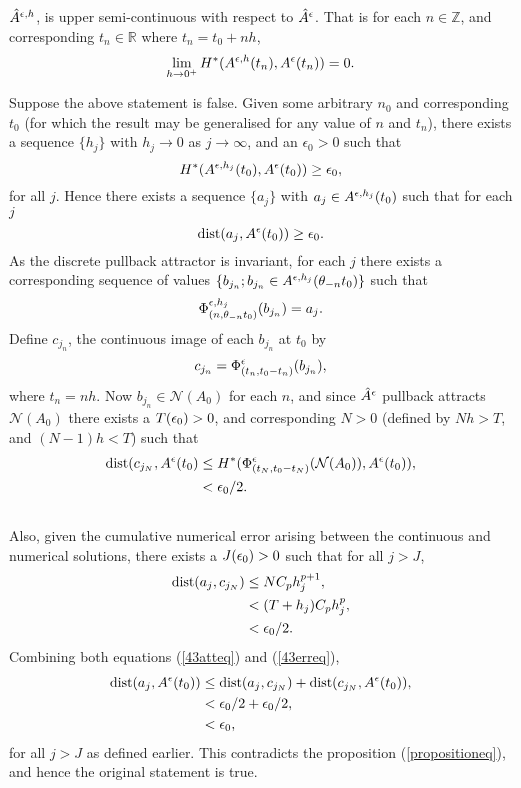 \begin{cor}
  $\hat{A}^{\epsilon, h}$, is upper semi-continuous with respect to
  $\hat{A}^{\epsilon}$. That is for each $n \in \mathbb{Z}$, and corresponding
  $t_n \in \mathbb{R}$ where $t_n = t_0 + nh$,
  \begin{equation}
  \lim_{h \to 0^+} H^*(A^{\epsilon, h}(t_n),A^{\epsilon}(t_n)) = 0.
  \end{equation}
\end{cor}
\begin{prf}
  Suppose the above statement is false. Given some arbitrary
  $n_0$ and corresponding $t_0$ (for which the result may be generalised for
  any value of $n$ and $t_n$), there exists a sequence $\{ h_j \}$ with $h_j
  \to 0$ as $j \to \infty$, and an $\epsilon_0 > 0$ such that
  \[ H^*(A^{\epsilon, h_j}(t_0),A^{\epsilon}(t_0)) \geq \epsilon_0, \]
  for all $j$. Hence there exists a sequence $\{ a_j \}$ with $a_j \in
  A^{\epsilon, h_j}(t_0)$ such that for each $j$
  \begin{equation}
  \label{propositioneq}
  {\rm dist} (a_j,A^{\epsilon}(t_0)) \geq \epsilon_0.
  \end{equation}
  As the discrete pullback attractor is invariant, for each $j$ there exists a
  corresponding sequence of values $\{ b_{j_n} ; b_{j_n} \in
  A^{\epsilon, h_j}(\theta_{-n}t_0) \}$ such that
  \[ \Phi^{\epsilon,h_j}_{(n,\theta_{-n}t_0)}(b_{j_n}) = a_j. \]
  Define $c_{j_n}$, the continuous image of each $b_{j_n}$ at $t_0$ by
\[ c_{j_n}   = \Phi^{\epsilon}_{(t_n,t_0 - t_n)}(b_{j_n}), \]
  where $t_n =   nh$. Now $b_{j_n} \in   \mathcal{N}(A_0)$ for each $n$, and
  since   $\hat{A}^{\epsilon}$ pullback attracts   $\mathcal{N}(A_0)$ there exists a
  $T(\epsilon_0) > 0$, and corresponding $N > 0$   (defined by $Nh > T$, and $(N-1)h
  < T$) such that
\begin{align}
  {\rm dist}(c_{j_N},A^{\epsilon}(t_0) &\leq H^*(\Phi^{\epsilon}_{(t_N,t_0 -
                t_N)}(\mathcal{N}(A_0)),A^{\epsilon}(t_0)), \nonumber \\
  &< \epsilon_0 / 2. \label{43atteq} \\ \nonumber
  \end{align}
  Also, given the cumulative numerical error arising between the continuous and
  numerical solutions, there exists a $J(\epsilon_0) > 0$ such that for all
  $j > J$,
  \begin{align}
    {\rm dist}(a_{j},c_{j_N}) &\leq N C_p h^{p+1}_j, \nonumber \\
    & < (T + h_j)C_p h^p_j, \nonumber \\
    & < \epsilon_0 / 2. \label{43erreq} 
  \end{align}
  Combining both equations (\ref{43atteq}) and (\ref{43erreq}),
  \begin{align*}
  {\rm dist}(a_{j}, A^{\epsilon}(t_0)) &\leq {\rm dist}(a_{j},c_{j_N}) +
                {\rm dist}(c_{j_N},A^{\epsilon}(t_0)), \\
  & < \epsilon_0 / 2 + \epsilon_0 / 2, \\
  & < \epsilon_0, \\
  \end{align*}
  for all $j > J$ as defined earlier. This contradicts the proposition
(\ref{propositioneq}), and hence the original statement is true.
\end{prf}

